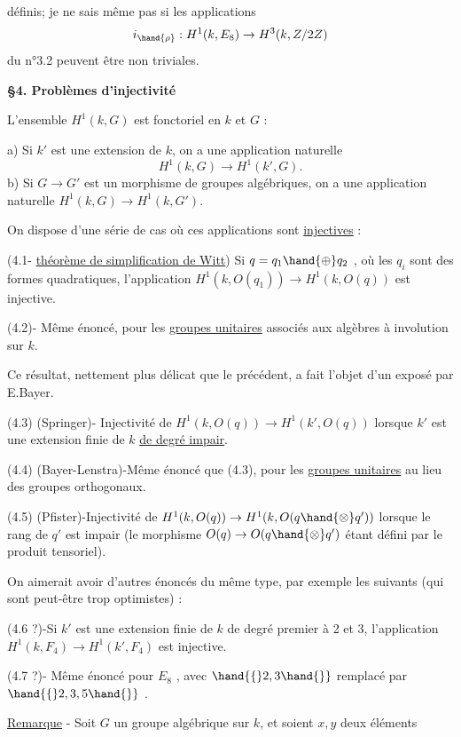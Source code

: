 
définis; je ne sais même pas si les applications
\[ i_{\hand{\rho}} : H^1(k, E_8) \rightarrow H^3(k, Z/2Z) \]
du n°3.2 peuvent être non triviales.

\textbf{§4. Problèmes d'injectivité}

L'ensemble $H^1(k, G)$ est fonctoriel en $k$ et $G$ :

a) Si $k'$ est une extension de $k$, on a une application naturelle
\[ H^1(k, G) \rightarrow H^1(k', G) . \]
b) Si $G \rightarrow G'$ est un morphisme de groupes algébriques, on a une
application naturelle $H^1(k, G) \rightarrow H^1(k, G')$.

On dispose d'une série de cas où ces applications sont \uline{injectives} :

(4.1\unsure{\hand{)}}- \uline{théorème de simplification de Witt}) Si $q = q_1 \hand{\oplus} q_2$ , où les $q_i$
sont des formes quadratiques, l'application $H^1(k, O(q_1)) \rightarrow H^1(k, O(q))$
est injective.

(4.2)- Même énoncé, pour les \uline{groupes unitaires} associés aux algèbres à involution
sur $k$.

Ce résultat, nettement plus délicat que le précédent, a fait l'objet d'un
exposé par E.Bayer.

(4.3) (Springer)- Injectivité de $H^1(k, O(q)) \rightarrow H^1(k', O(q))$ lorsque
$k'$ est une extension finie de $k$ \uline{de degré impair}.

(4.4) (Bayer-Lenstra)-Même énoncé que (4.3), pour les \uline{groupes unitaires}
au lieu des groupes orthogonaux.

(4.5) (Pfister)-Injectivité de $H^1(k, O(q)) \rightarrow H^1(k, O(q \hand{\otimes} q'))$ lorsque
le rang de $q'$ est impair (le morphisme $O(q) \rightarrow O(q \hand{\otimes} q')$ étant défini
par le produit tensoriel).

On aimerait avoir d'autres énoncés du même type, par exemple les suivants
(qui sont peut-être trop optimistes) :

(4.6 ?)-Si $k'$ est une extension finie de $k$ de degré premier à 2 et
3, l'application $H^1(k, F_4) \rightarrow H^1(k', F_4)$ est injective.

(4.7 ?)- Même énoncé pour $E_8$ , avec $\hand{\{}2,3\hand{\}}$ remplacé par $\hand{\{}2,3,5\hand{\}}$ .

\uline{Remarque} - Soit $G$ un groupe algébrique sur $k$, et soient $x,y$ deux éléments

